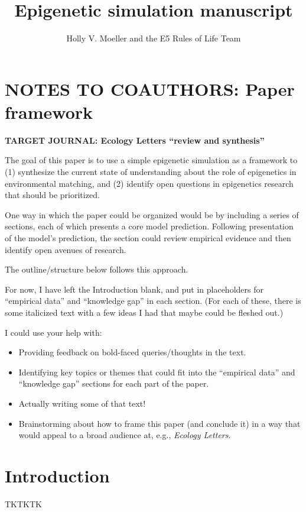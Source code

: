 \documentclass{article}
\title{Epigenetic simulation manuscript}
\author{Holly V. Moeller and the E5 Rules of Life Team }
\date{}
\begin{document}
\maketitle

\section{NOTES TO COAUTHORS: Paper framework}


\noindent \textbf{TARGET JOURNAL: Ecology Letters ``review and synthesis''}   

The goal of this paper is to use a simple epigenetic simulation as a framework to (1) synthesize the current state of understanding about the role of epigenetics in environmental matching, and (2) identify open questions in epigenetics research that should be prioritized. 

One way in which the paper could be organized would be by including a series of sections, each of which presents a core model prediction. Following presentation of the model's prediction, the section could review empirical evidence and then identify open avenues of research.

The outline/structure below follows this approach.

For now, I have left the Introduction blank, and put in placeholders for ``empirical data'' and ``knowledge gap'' in each section. (For each of these, there is some italicized text with a few ideas I had that maybe could be fleshed out.)

I could use your help with:
\begin{itemize}
    \item Providing feedback on bold-faced queries/thoughts in the text.
    \item Identifying key topics or themes that could fit into the ``empirical data'' and ``knowledge gap'' sections for each part of the paper.
    \item Actually writing some of that text!
    \item Brainstorming about how to frame this paper (and conclude it) in a way that would appeal to a broad audience at, e.g., \textit{Ecology Letters}.
\end{itemize}

\section{Introduction}

TKTKTK
\end{document}
